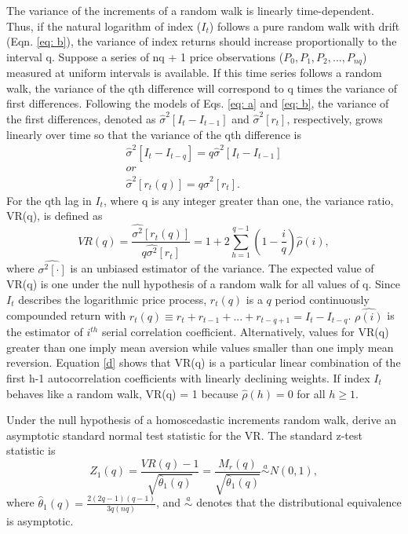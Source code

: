 \documentclass[AEJ,reqno, draftmode]{AEA}
\begin{document}
The variance of the increments of a random walk is linearly time-dependent. Thus, if the natural logarithm of index ($I_t$) follows a pure random walk with drift (Eqn. \eqref{eq: b}), the variance of index returns should increase proportionally to the interval q. Suppose a series of nq + 1 price observations ($P_0, P_1, P_2,...,P_{nq}$) measured at uniform intervals is available. If this time series follows a random walk, the variance of the qth difference will correspond to q times the variance of first differences. Following the models of Eqs. \eqref{eq: a} and \eqref{eq: b}, the variance of the first differences, denoted as $\hat{\sigma}^2[I_t - I_{t-1}]$ and $\hat{\sigma}^2[r_t]$, respectively, grows linearly over time so that the variance of the qth difference is 
\begin{equation}
\label{eq: c}
    \begin{gathered}
        \hat{\sigma}^2[I_t - I_{t-q}] = q\hat{\sigma}^2[I_t - I_{t-1}]   \\ 
            or \\
          \hat{\sigma}^2[r_t(q)] = q\hat{\sigma}^2[r_t].
      \end{gathered}
\end{equation}For the qth lag in $I_t$, where q is any integer greater than one, the variance ratio, VR(q), is defined as
\begin{equation} \label{d}
    VR(q) = \frac{\hat{\sigma^2}[r_t(q)]}{q\hat{\sigma^2}[r_t]} = 1 + 2\sum_{h=1}^{q-1}(1-\frac{i}{q})\hat{\rho}(i),
\end{equation}where $\hat{\sigma^2[\cdot]}$ is an unbiased estimator of the variance. The expected value of VR(q) is one under the null hypothesis of a random walk for all values of q. Since $I_t$ describes the logarithmic price process, $r_t(q)$ is a $q$ period continuously compounded return with $r_t(q) \equiv r_t + r_{t-1} + ... + r_{t-q+1} = I_t - I_{t-q}$. $\hat{\rho(i)}$ is the estimator of $i^{th}$ serial correlation coefficient. Alternatively, values for VR(q) greater than one imply mean aversion while values smaller than one imply mean reversion. Equation \eqref{d} shows that VR(q) is a particular linear combination of the first h-1 autocorrelation coefficients with linearly declining weights. If index $I_t$ behaves like a random walk, VR(q) = 1 because $\hat{\rho}(h) = 0$ for all $h\geq 1$.

Under the null hypothesis of a homoscedastic increments random walk, \citet{lo1988stock} derive an asymptotic standard normal test statistic for the VR. The standard z-test statistic is 
\begin{equation} \label{e}
    Z_1(q) = \frac{VR(q)-1}{\sqrt{\hat{\theta}_1(q)}} =  \frac{M_r(q)}{\sqrt{\hat{\theta}_1(q)}} \stackrel{a}{\sim} N(0,1) ,
\end{equation}where $\hat{\theta}_1(q) = \frac{2(2q-1)(q-1)}{3q(nq)}$, and $\stackrel{a}{\sim}$ denotes that the distributional equivalence is asymptotic.
\end{document}
